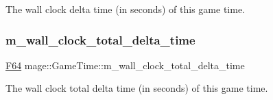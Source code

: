 The wall clock delta time (in seconds) of this game time. \mbox{\label{classmage_1_1_game_time_a5c2527df90b45a7b4e914c8811fcf52d}} 
\subsubsection{\texorpdfstring{m\+\_\+wall\+\_\+clock\+\_\+total\+\_\+delta\+\_\+time}{m\_wall\_clock\_total\_delta\_time}}
{\footnotesize\ttfamily \mbox{\hyperlink{namespacemage_ad26233bbec640deda836e572c1a23708}{F64}} mage\+::\+Game\+Time\+::m\+\_\+wall\+\_\+clock\+\_\+total\+\_\+delta\+\_\+time\hspace{0.3cm}{\ttfamily [private]}}

The wall clock total delta time (in seconds) of this game time. 